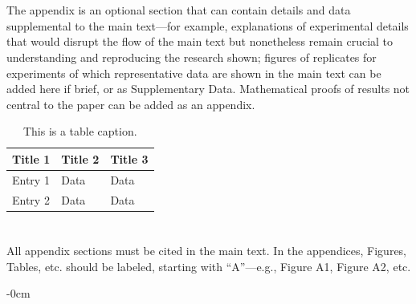 \documentclass[vision,article,submit,pdftex,moreauthors]{Definitions/mdpi}
\begin{document}
\appendixstart
\appendix
\section[\appendixname~\thesection]{}
\subsection[\appendixname~\thesubsection]{}
The appendix is an optional section that can contain details and data supplemental to the main text---for example, explanations of experimental details that would disrupt the flow of the main text but nonetheless remain crucial to understanding and reproducing the research shown; figures of replicates for experiments of which representative data are shown in the main text can be added here if brief, or as Supplementary Data. Mathematical proofs of results not central to the paper can be added as an appendix.

\begin{table}[H] 
\caption{This is a table caption.\label{tab5}}
\begin{tabularx}{\textwidth}{CCC}
\toprule
\textbf{Title 1}	& \textbf{Title 2}	& \textbf{Title 3}\\
\midrule
Entry 1		& Data			& Data\\
Entry 2		& Data			& Data\\
\bottomrule
\end{tabularx}
\end{table}

\section[\appendixname~\thesection]{}
All appendix sections must be cited in the main text. In the appendices, Figures, Tables, etc. should be labeled, starting with ``A''---e.g., Figure A1, Figure A2, etc.

\begin{adjustwidth}{-\extralength}{0cm}




\end{adjustwidth}
\end{document}
